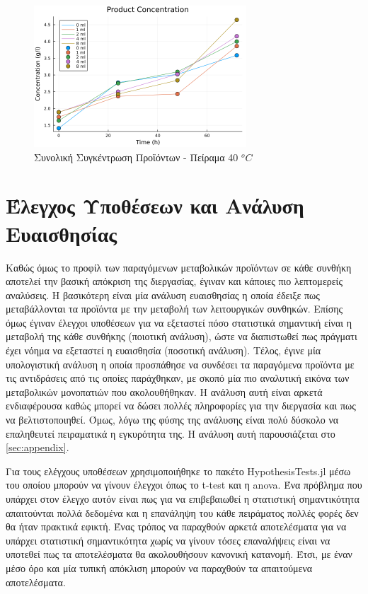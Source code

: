 \documentclass[11pt]{report}
\begin{document}
\begin{enumerate}
\begin{figure}[htbp]
\centering
\includegraphics[width=300px]{../plots/28_11/product_conc_scatter_28_11.png}
\caption{\label{fig:orgdca1f2f}Συνολική Συγκέντρωση Προϊόντων - Πείραμα 40 \(^oC\)}
\end{figure}
\end{enumerate}

\section{Έλεγχος Υποθέσεων και Ανάλυση Ευαισθησίας}
\label{sec:org47db60e}
Καθώς όμως το προφίλ των παραγόμενων μεταβολικών προϊόντων σε κάθε συνθήκη αποτελεί την βασική απόκριση της διεργασίας, έγιναν και κάποιες πιο λεπτομερείς αναλύσεις. Η βασικότερη είναι μία ανάλυση ευαισθησίας η οποία έδειξε πως μεταβάλλονται τα προϊόντα με την μεταβολή των λειτουργικών συνθηκών. Επίσης όμως έγιναν έλεγχοι υποθέσεων για να εξεταστεί πόσο στατιστικά σημαντική είναι η μεταβολή της κάθε συνθήκης (ποιοτική ανάλυση), ώστε να διαπιστωθεί πως πράγματι έχει νόημα να εξεταστεί η ευαισθησία (ποσοτική ανάλυση). Τέλος, έγινε μία υπολογιστική ανάλυση η οποία προσπάθησε να συνδέσει τα παραγόμενα προϊόντα με τις αντιδράσεις από τις οποίες παράχθηκαν, με σκοπό μία πιο αναλυτική εικόνα των μεταβολικών μονοπατιών που ακολουθήθηκαν. Η ανάλυση αυτή είναι αρκετά ενδιαφέρουσα καθώς μπορεί να δώσει πολλές πληροφορίες για την διεργασία και πως να βελτιστοποιηθεί. Όμως, λόγω της φύσης της ανάλυσης είναι πολύ δύσκολο να επαληθευτεί πειραματικά η εγκυρότητα της. Η ανάλυση αυτή παρουσιάζεται στο \autoref{sec:appendix}.

Για τους ελέγχους υποθέσεων χρησιμοποιήθηκε το πακέτο HypothesisTests.jl μέσω του οποίου μπορούν να γίνουν έλεγχοι όπως το t-test και η \acrfull{anova}. Ένα πρόβλημα που υπάρχει στον έλεγχο αυτόν είναι πως για να επιβεβαιωθεί η στατιστική σημαντικότητα απαιτούνται πολλά δεδομένα και η επανάληψη του κάθε πειράματος πολλές φορές δεν θα ήταν πρακτικά εφικτή. Ένας τρόπος να παραχθούν αρκετά αποτελέσματα για να υπάρχει στατιστική σημαντικότητα χωρίς να γίνουν τόσες επαναλήψεις είναι να υποτεθεί πως τα αποτελέσματα θα ακολουθήσουν κανονική κατανομή. Έτσι, με έναν μέσο όρο και μία τυπική απόκλιση μπορούν να παραχθούν τα απαιτούμενα αποτελέσματα.
\end{document}
